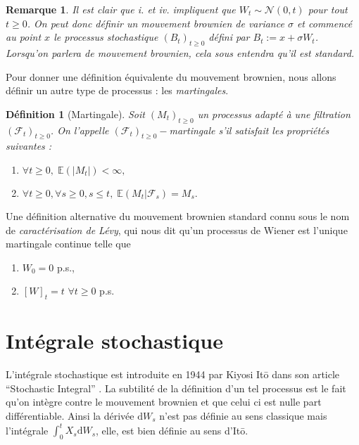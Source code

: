 \documentclass[openany]{book}
\newcommand{\F}{\mathscr{F}}
\newcommand{\E}{\mathbb{E}}
\newcommand{\1}{\mathbbm{1}}
\renewcommand{\d}{\mathrm{d}}
\theoremstyle{thmfont}
\theoremstyle{deffont}
\newtheorem{definition}[definition]{Définition}
\theoremstyle{thmfont}
\theoremstyle{deffont}
\newtheorem{remark}[remark]{Remarque}
\begin{document}
\begin{remark}
  Il est clair que \textit{i.} et \textit{iv.} impliquent que $W_t \sim \mathcal{N}(0,t)$ pour tout $t \geq 0$. On peut donc définir un mouvement brownien de variance $\sigma$ et commencé au point $x$ le processus stochastique $(B_t)_{t\geq0}$ défini par $B_t := x + \sigma W_t$. Lorsqu'on parlera de mouvement brownien, cela sous entendra qu'il est standard.
\end{remark}

Pour donner une définition équivalente du mouvement brownien, nous allons définir un autre type de processus : les \textit{martingales}.

  \begin{definition}[Martingale]
  Soit $(M_t)_{t\geq0}$ un processus adapté à une filtration $(\F_t)_{t\geq0}$. On l'appelle $(\F_t)_{t\geq0}-$\textit{martingale} s'il satisfait les propriétés suivantes : 
  \begin{enumerate}
  \item $\forall t\geq 0,\;\E\left(|M_t|\right) < \infty,$
  \item $\forall t\geq 0, \forall s \geq 0, s \leq t,\;\E\left(M_t|\F_s\right) = M_s.$
  \end{enumerate}
  \end{definition}
Une définition alternative du mouvement brownien standard connu sous le nom de \textit{caractérisation de Lévy}, qui nous dit qu'un processus de Wiener est l'unique martingale continue telle que
\begin{enumerate}
\item $W_0 = 0$ p.s.,
\item $[W]_t = t$ $\forall t\geq0$ p.s.
  \label{def:MvtBorwnien_caractLevy}
\end{enumerate}


\section{Intégrale stochastique}
L'intégrale stochastique est introduite en 1944 par Kiyosi Itō dans son article ``Stochastic Integral'' \cite{ito1944}. La subtilité de la définition d'un tel processus est le fait qu'on intègre contre le mouvement brownien et que celui ci est nulle part différentiable. Ainsi la dérivée $\d W_s$ n'est pas définie au sens classique mais l'intégrale $\int_0^t X_s \d W_s$, elle, est bien définie au sens d'Itō.
\end{document}
